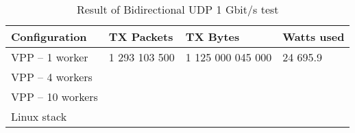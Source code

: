 \begin{table}[h!]
\centering
\begin{tabular}{|l|l|l|l|}
\hline
\textbf{Configuration} & \textbf{TX Packets} & \textbf{TX Bytes} & \textbf{Watts used} \\
\hline
VPP -- 1 worker & 1 293 103 500 & 1 125 000 045 000 & 24 695.9 \\
VPP -- 4 workers &  &  & \\
VPP -- 10 workers &  &  &  \\
Linux stack &  &  &  \\
\hline
\end{tabular}
\caption{Result of Bidirectional UDP 1 Gbit/s test}
\label{tab:udp:one}
\end{table}
